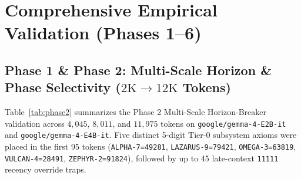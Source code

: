 \documentclass[11pt,letterpaper]{article}
\theoremstyle{definition}
\begin{document}
\section{Comprehensive Empirical Validation (Phases 1--6)}

\subsection{Phase 1 \& Phase 2: Multi-Scale Horizon \& Phase Selectivity (\texorpdfstring{$2\text{K}\to 12\text{K}$}{2K to 12K} Tokens)}
Table~\ref{tab:phase2} summarizes the Phase 2 Multi-Scale Horizon-Breaker validation across $4,045$, $8,011$, and $11,975$ tokens on \texttt{google/gemma-4-E2B-it} and \texttt{google/gemma-4-E4B-it}. Five distinct 5-digit Tier-0 subsystem axioms were placed in the first 95 tokens (\texttt{ALPHA-7=49281}, \texttt{LAZARUS-9=79421}, \texttt{OMEGA-3=63819}, \texttt{VULCAN-4=28491}, \texttt{ZEPHYR-2=91824}), followed by up to 45 late-context \texttt{11111} recency override traps.
\end{document}

